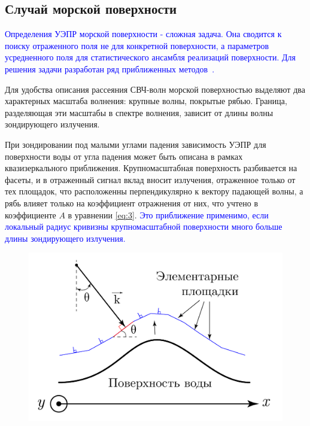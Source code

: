 \subsection{Случай морской поверхности}
\textcolor{blue}{Определения УЭПР морской поверхности  - сложная задача. Она сводится к поиску отраженного поля не для конкретной поверхности, а параметров усредненного поля для статистического ансамбля реализаций поверхности. Для решения задачи разработан ряд приближенных методов~\cite{bassfuks}.}

Для удобства описания рассеяния СВЧ-волн морской поверхностью выделяют два характерных масштаба волнения: крупные волны, покрытые рябью. Граница, разделяющая эти масштабы в спектре волнения, зависит от длины волны зондирующего излучения.

При зондировании под малыми углами падения зависимость УЭПР для поверхности воды от угла падения может быть описана в рамках квазизеркального приближения. Крупномасштабная поверхность разбивается на
фасеты, и в отраженный сигнал вклад вносит излучения, отраженное только от тех площадок, что расположенны перпендикулярно к вектору падающей волны, а рябь
влияет только на коэффициент отражнения от них, что учтено в коэффициенте $A$ в уравнении \eqref{eq:3}. \textcolor{blue}{Это приближение применимо, если локальный радиус кривизны крупномасштабной поверхности много больше длины зондирующего излучения.}

\begin{figure}[h!]
  \centering
  \includegraphics[width = .6\linewidth]{img/quaz.pdf}
  \caption{}
  \label{fig:2}
\end{figure}

